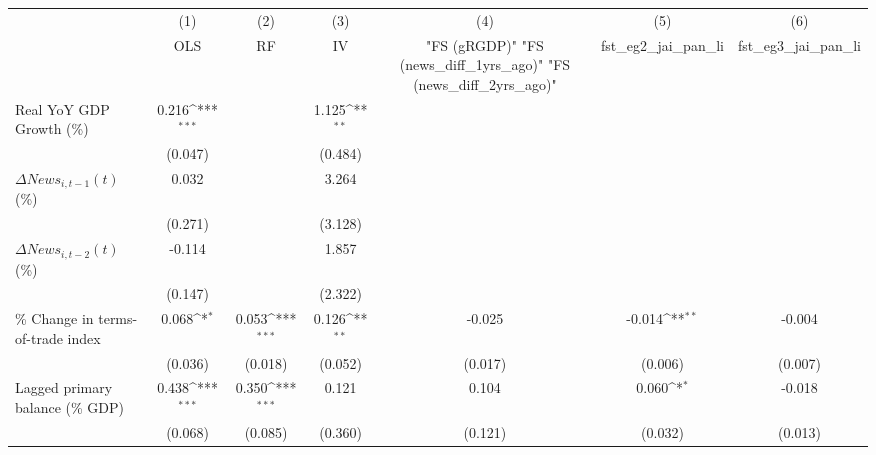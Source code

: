 {
\def\sym#1{\ifmmode^{#1}\else\(^{#1}\)\fi}
\begin{tabular}{l*{6}{c}}
\toprule
                    &\multicolumn{1}{c}{(1)}&\multicolumn{1}{c}{(2)}&\multicolumn{1}{c}{(3)}&\multicolumn{1}{c}{(4)}&\multicolumn{1}{c}{(5)}&\multicolumn{1}{c}{(6)}\\
                    &\multicolumn{1}{c}{OLS}&\multicolumn{1}{c}{RF}&\multicolumn{1}{c}{IV}&\multicolumn{1}{c}{ "FS (gRGDP)"  "FS (news_diff_1yrs_ago)"  "FS (news_diff_2yrs_ago)" }&\multicolumn{1}{c}{fst_eg2_jai_pan_li}&\multicolumn{1}{c}{fst_eg3_jai_pan_li}\\
\midrule
Real YoY GDP Growth (\%)&       0.216\sym{***}&                     &       1.125\sym{**} &                     &                     &                     \\
                    &     (0.047)         &                     &     (0.484)         &                     &                     &                     \\
\addlinespace
$ \Delta News_{i,t-1}(t)$ (\%)&       0.032         &                     &       3.264         &                     &                     &                     \\
                    &     (0.271)         &                     &     (3.128)         &                     &                     &                     \\
\addlinespace
$ \Delta News_{i,t-2}(t)$ (\%)&      -0.114         &                     &       1.857         &                     &                     &                     \\
                    &     (0.147)         &                     &     (2.322)         &                     &                     &                     \\
\addlinespace
\% Change in terms-of-trade index&       0.068\sym{*}  &       0.053\sym{***}&       0.126\sym{**} &      -0.025         &      -0.014\sym{**} &      -0.004         \\
                    &     (0.036)         &     (0.018)         &     (0.052)         &     (0.017)         &     (0.006)         &     (0.007)         \\
\addlinespace
Lagged primary balance (\% GDP)&       0.438\sym{***}&       0.350\sym{***}&       0.121         &       0.104         &       0.060\sym{*}  &      -0.018         \\
                    &     (0.068)         &     (0.085)         &     (0.360)         &     (0.121)         &     (0.032)         &     (0.013)         \\

\end{tabular}}
